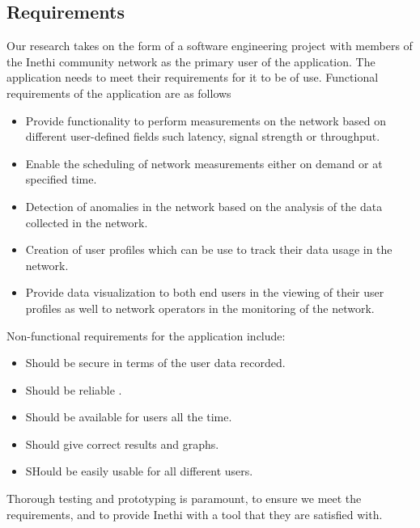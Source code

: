\subsection{Requirements}
Our research takes on the form of a software engineering project with members of the Inethi community network as the primary user of the application. The application needs to meet their requirements for it to be of use.
Functional requirements of the application are as follows 
\begin{itemize} %
	\item Provide functionality to perform measurements on the network based on different user-defined fields such latency, signal strength or throughput. %
	\item Enable the scheduling of network measurements either on demand or at specified time. %
	\item Detection of anomalies in the network based on the analysis of the data collected in the network.
	\item Creation of user profiles which can be use to track their data usage in the network.
	\item Provide data visualization to both end users in the viewing of their user profiles as well to network operators in the monitoring of the network.
\end{itemize}
Non-functional requirements for the application include:
\begin{itemize}
	\item Should be secure in terms of the user data recorded.
	\item Should be reliable .
	\item Should be available for users all the time.
	\item Should  give correct results and graphs.
	\item SHould be easily usable for all different users.
\end{itemize}
Thorough testing and prototyping is paramount, to ensure we meet the requirements, and to provide Inethi with a tool that they are satisfied with.
